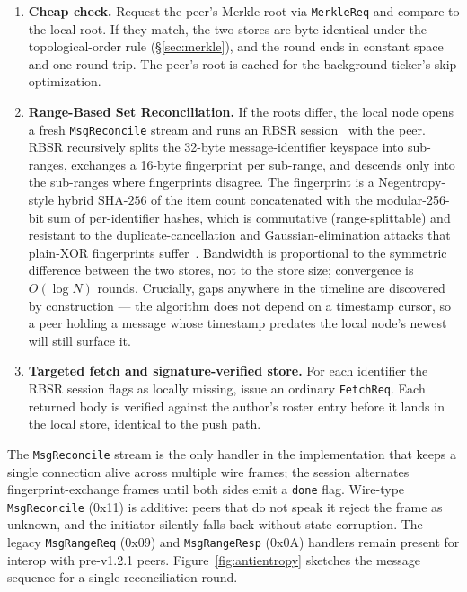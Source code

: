 \documentclass[11pt,a4paper,twocolumn]{article}
\begin{document}
\begin{enumerate}
    \item \textbf{Cheap check.} Request the peer's Merkle root via
    \texttt{MerkleReq} and compare to the local root. If they match, the
    two stores are byte-identical under the topological-order rule
    (\S\ref{sec:merkle}), and the round ends in constant space and one
    round-trip. The peer's root is cached for the background ticker's
    skip optimization.
    \item \textbf{Range-Based Set Reconciliation.} If the roots differ,
    the local node opens a fresh \texttt{MsgReconcile} stream and runs
    an RBSR session~\citep{meyer2023rbsr} with the peer. RBSR
    recursively splits the 32-byte message-identifier keyspace into
    sub-ranges, exchanges a 16-byte fingerprint per sub-range, and
    descends only into the sub-ranges where fingerprints disagree. The
    fingerprint is a Negentropy-style hybrid $\mathrm{SHA\text{-}256}$
    of the item count concatenated with the modular-256-bit sum of
    per-identifier hashes, which is commutative (range-splittable)
    and resistant to the duplicate-cancellation and
    Gaussian-elimination attacks that plain-XOR fingerprints
    suffer~\citep{willow2023, negentropyNIP77}. Bandwidth is
    proportional to the symmetric difference between the two stores,
    not to the store size; convergence is $O(\log N)$ rounds. Crucially,
    gaps anywhere in the timeline are discovered by construction ---
    the algorithm does not depend on a timestamp cursor, so a peer
    holding a message whose timestamp predates the local node's newest
    will still surface it.
    \item \textbf{Targeted fetch and signature-verified store.} For
    each identifier the RBSR session flags as locally missing, issue
    an ordinary \texttt{FetchReq}. Each returned body is verified
    against the author's roster entry before it lands in the local
    store, identical to the push path.
\end{enumerate}

The \texttt{MsgReconcile} stream is the only handler in the
implementation that keeps a single connection alive across multiple
wire frames; the session alternates fingerprint-exchange frames until
both sides emit a \texttt{done} flag. Wire-type
\texttt{MsgReconcile} (0x11) is additive: peers that do not speak it
reject the frame as unknown, and the initiator silently falls back
without state corruption. The legacy \texttt{MsgRangeReq} (0x09) and
\texttt{MsgRangeResp} (0x0A) handlers remain present for interop with
pre-v1.2.1 peers. Figure~\ref{fig:antientropy} sketches the message
sequence for a single reconciliation round.
\end{document}
